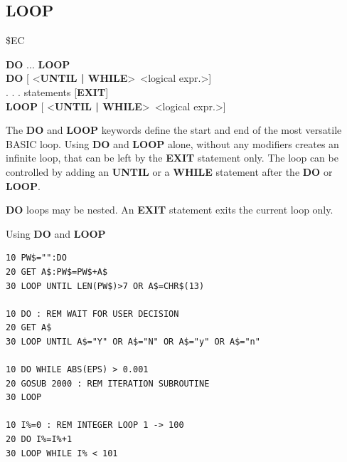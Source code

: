 
\newpage
\subsection{LOOP}
\begin{description}[leftmargin=2cm,style=nextline]
\item [Token:] \$EC
\item [Format:] {\bf DO} ... {\bf LOOP} \\
                {\bf DO} [ <{\bf UNTIL | WHILE}> <logical expr.>] \\
                . . . statements [{\bf EXIT}] \\
                {\bf LOOP} [ <{\bf UNTIL | WHILE}> <logical expr.>]
\item [Usage:] The {\bf DO} and {\bf LOOP} keywords define
               the start and end of the most versatile BASIC loop.
               Using {\bf DO} and {\bf LOOP} alone, without any
               modifiers creates an infinite loop, that can be left
               by the {\bf EXIT} statement only. The loop can be
               controlled by adding an {\bf UNTIL} or a {\bf WHILE}
               statement after the {\bf DO} or {\bf LOOP}.

\item [Remarks:] {\bf DO} loops may be nested. An {\bf EXIT} statement
               exits the current loop only.
\item [Example:] Using {\bf DO} and {\bf LOOP}
\begin{tcolorbox}[colback=black,coltext=white]
\verbatimfont{\codefont}
\begin{verbatim}
10 PW$="":DO
20 GET A$:PW$=PW$+A$
30 LOOP UNTIL LEN(PW$)>7 OR A$=CHR$(13)

10 DO : REM WAIT FOR USER DECISION
20 GET A$
30 LOOP UNTIL A$="Y" OR A$="N" OR A$="y" OR A$="n"

10 DO WHILE ABS(EPS) > 0.001
20 GOSUB 2000 : REM ITERATION SUBROUTINE
30 LOOP

10 I%=0 : REM INTEGER LOOP 1 -> 100
20 DO I%=I%+1
30 LOOP WHILE I% < 101
\end{verbatim}
\end{tcolorbox}
\end{description}


\newpage
